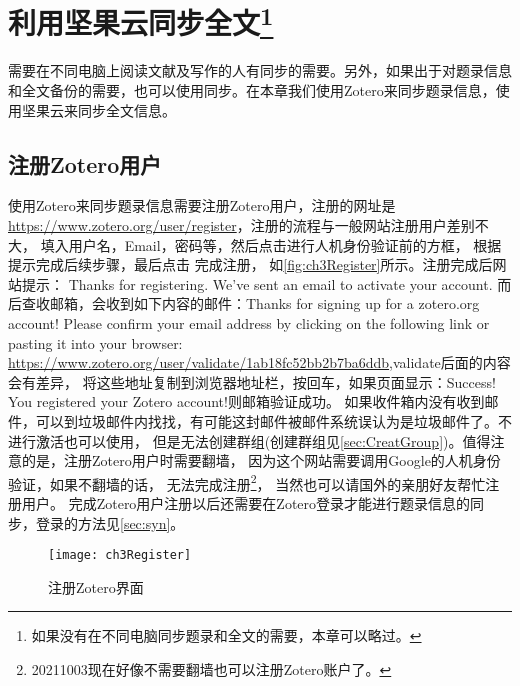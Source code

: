 \documentclass[cn,11pt,chinese]{elegantbook}
\begin{document}
	\chapter[利用坚果云同步全文]{利用坚果云同步全文\footnote{如果没有在不同电脑同步题录和全文的需要，本章可以略过。}}\label{ch:syn}		
		需要在不同电脑上阅读文献及写作的人有同步的需要。另外，如果出于对题录信息和全文备份的需要，也可以使用同步。在本章我们使用Zotero来同步题录信息，使用坚果云来同步全文信息。
			\section{注册Zotero用户}\label{sec:zotReg}
		使用Zotero来同步题录信息需要注册Zotero用户，注册的网址是\url{https://www.zotero.org/user/register}，注册的流程与一般网站注册用户差别不大，
		填入用户名，Email，密码等，然后点击进行人机身份验证前的方框，
		根据提示完成后续步骤，最后点击 完成注册，
		如\autoref{fig:ch3Register}所示。注册完成后网站提示：
		Thanks for registering. We’ve sent an email to activate your account.
		而后查收邮箱，会收到如下内容的邮件：Thanks for signing up for a zotero.org account! Please confirm your email address 
		by clicking on the following link or pasting it into your browser: 
		\url{https://www.zotero.org/user/validate/1ab18fc52bb2b7ba6ddb},validate后面的内容会有差异，
		将这些地址复制到浏览器地址栏，按回车，如果页面显示：Success! You registered your Zotero account!则邮箱验证成功。
		如果收件箱内没有收到邮件，可以到垃圾邮件内找找，有可能这封邮件被邮件系统误认为是垃圾邮件了。不进行激活也可以使用，
		但是无法创建群组(创建群组见\cref{sec:CreatGroup})。值得注意的是，注册Zotero用户时需要翻墙，
		因为这个网站需要调用Google的人机身份验证，如果不翻墙的话，
		无法完成注册\footnote{20211003现在好像不需要翻墙也可以注册Zotero账户了。}，
		当然也可以请国外的亲朋好友帮忙注册用户。
		完成Zotero用户注册以后还需要在Zotero登录才能进行题录信息的同步，登录的方法见\cref{sec:syn}。
		\begin{figure}[htbp]
			\centering
			\texttt{[image: ch3Register]}
			\caption{注册Zotero界面}
			\label{fig:ch3Register}
		\end{figure}
		
\end{document}
